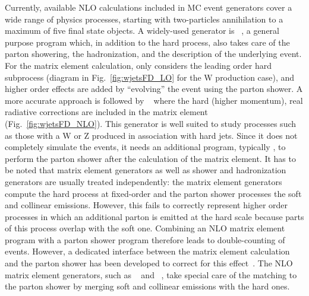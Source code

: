 Currently, available NLO calculations included in MC event generators cover a wide range of physics processes, starting with two-particles annihilation to a maximum of five final state objects.
A widely-used generator is \PYTHIA{}~\cite{Sjostrand:2007gs,Sjostrand:2006za}, a general purpose program which, in addition to the hard process, also takes care of the parton showering, the hadronization, and the description of the underlying event.
For the matrix element calculation, \PYTHIA{} only considers the leading order hard subprocess (diagram in Fig.~\ref{fig:wjetsFD_LO} for the W production case), and higher
order effects are added by ``evolving'' the event using the parton shower.
A more accurate approach is followed by \MADGRAPH{}~\cite{Alwall:2011uj} where the hard (higher momentum), real radiative
corrections are included in the matrix element (Fig.~\ref{fig:wjetsFD_NLO}). %
This generator is well suited to study processes such as those with a W or Z produced in association with hard jets.
Since it does not completely simulate the events, it needs an additional program, typically \PYTHIA{}, to perform the parton shower after the calculation of the matrix element.
It has to be noted that matrix element generators as well as shower and hadronization generators are usually treated independently: the matrix element generators compute the hard process at fixed-order and the parton shower processes the soft and collinear emissions. However, this fails to correctly represent higher order processes in which an additional parton is emitted at the hard scale because parts of this process overlap with the soft one. Combining an NLO matrix element program with a parton shower program therefore leads to double-counting of events. However, a dedicated interface between the matrix element calculation and the parton shower has been developed to correct for this effect~\cite{Hoche:2006ph}. The NLO matrix element generators, such as \POWHEG{}~\cite{Frixione:2007vw} and \MCATNLO{}~\cite{Frixione:2003ei}, take special care of the matching to the parton shower by merging soft and collinear emissions with the hard ones.
